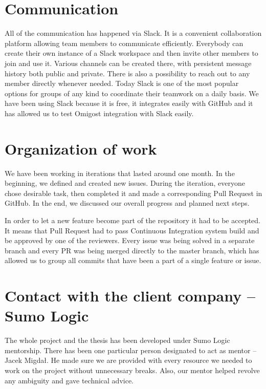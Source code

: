 \documentclass[licencjacka,en]{thesisclass}
\begin{document}
    \section{Communication}

    All of the communication has happened via Slack.
    It is a convenient collaboration platform allowing team members
    to communicate efficiently.
    Everybody can create their own instance of a Slack workspace and then
    invite other members to join and use it.
    Various channels can be created there,
    with persistent message history both public and private.
    There is also a possibility to reach out to any member directly whenever needed.
    Today Slack is one of the most popular options for groups of any kind to coordinate
    their teamwork on a daily basis.
    We have been using Slack because it is free, it integrates easily with GitHub
    and it has allowed us to test Omigost integration with Slack easily.

    \section{Organization of work}

    We have been working in iterations that lasted around one month.
    In the beginning, we defined and created new issues.
    During the iteration, everyone chose desirable task,
    then completed it and made a corresponding Pull Request in GitHub.
    In the end, we discussed our overall progress and planned next steps.

    In order to let a new feature become part of the repository it had to be accepted.
    It means that Pull Request had to pass Continuous Integration
    system build and be approved by one of the reviewers.
    Every issue was being solved in a separate branch and every PR
    was being merged directly to the master branch, which has allowed us
    to group all commits that have been a part of a single feature or issue.

    \section{Contact with the client company -- Sumo Logic}

    The whole project and the thesis has been developed under Sumo Logic mentorship.
    There has been one particular person designated to act as mentor -- Jacek Migdał.
    He made sure we are provided with every resource we needed to
    work on the project without unnecessary breaks.
    Also, our mentor helped revolve any ambiguity and gave technical advice.
\end{document}
